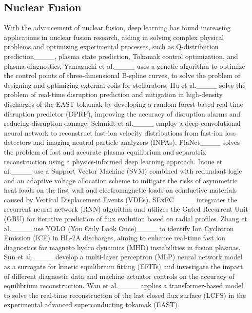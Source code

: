 \subsection{Nuclear Fusion}

With the advancement of nuclear fusion, deep learning has found increasing applications in nuclear fusion research, aiding in solving complex physical problems and optimizing experimental processes, such as Q-distribution prediction____, plasma state prediction, Tokamak control optimization, and plasma diagnostics. 
Yamaguchi et al.____ uses a genetic algorithm to optimize the control points of three-dimensional B-spline curves, to solve the problem of designing and optimizing external coils for stellarators. 
Hu et al.____ solve the problem of real-time disruption prediction and mitigation in high-density discharges of the EAST tokamak by developing a random forest-based real-time disruption predictor (DPRF), improving the accuracy of disruption alarms and reducing disruption damage. 
Schmidt et al.____ employ a deep convolutional neural network to reconstruct fast-ion velocity distributions from fast-ion loss detectors and imaging neutral particle analyzers (INPAs). PlaNet____ solves the problem of fast and accurate plasma equilibrium and separatrix reconstruction using a physics-informed deep learning approach. 
Inoue et al.____ use a Support Vector Machine (SVM) combined with redundant logic and an adaptive voltage allocation scheme to mitigate the risks of asymmetric heat loads on the first wall and electromagnetic loads on conductive materials caused by Vertical Displacement Events (VDEs). 
SExFC____ integrates the recurrent neural network (RNN) algorithm and utilizes the Gated Recurrent Unit (GRU) for iterative prediction of flux evolution based on radial profiles. 
Zhang et al.____ use YOLO (You Only Look Once)____ to identify Ion Cyclotron Emission (ICE) in HL-2A discharges, aiming to enhance real-time fast ion diagnostics for magneto hydro dynamics (MHD) instabilities in fusion plasmas. 
Sun et al.____ develop a multi-layer perceptron (MLP) neural network model as a surrogate for kinetic equilibrium fitting (EFITs) and investigate the impact of different diagnostic data and machine actuator controls on the accuracy of equilibrium reconstruction. 
Wan et al.____ applies a transformer-based model to solve the real-time reconstruction of the last closed flux surface (LCFS) in the experimental advanced superconducting tokamak (EAST).



